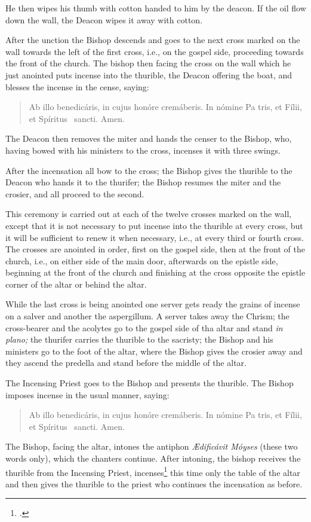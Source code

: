 \documentclass[letterpaper]{report}
\newcommand\blessincense{
\begin{quote}
   Ab illo benedicáris, in cujus honóre cremáberis. In nómine Pa\cross
    tris, et Fí\cross lii, et Spíritus \cross\ sancti. \rbar Amen.
\end{quote}
}
\begin{document}
{    He then wipes his thumb with cotton handed to him by the deacon. If the oil
    flow down the wall, the Deacon wipes it away with cotton.

    \rubric After the unction the Bishop descends and goes to the next cross
    marked on the wall towards the left of the first cross, i.e., on the
    gospel side, proceeding towards the front of the church. The bishop then
    facing the cross on the wall which he just anointed puts incense into the
    thurible, the Deacon offering the boat, and blesses the incense in the
    cense, saying: 

    \blessincense

    The Deacon then removes the miter and hands the censer to the Bishop, who,
    having bowed with his ministers to the cross, incenses it with three
    swings.

    After the incensation all bow to the cross; the Bishop gives the thurible
    to the Deacon who hands it to the thurifer; the Bishop resumes the miter
    and the crosier, and all proceed to the second. 
    
    \rubric This ceremony is carried out at each of the twelve crosses marked
    on the wall, except that it is not necessary to put incense into the
    thurible at every cross, but it will be sufficient to renew it when
    necessary, i.e., at every third or fourth cross. The crosses are anointed
    in order, first on the gospel side, then at the front of the church, i.e.,
    on either side of the main door, afterwards on the epistle side, beginning
    at the front of the church and finishing at the cross opposite the epistle
    corner of the altar or behind the altar.

    \rubric While the last cross is being anointed one server gets ready the
    grains of incense on a salver and another the aspergillum. A server takes
    away the Chrism; the cross-bearer and the acolytes go to the gospel side of
    tha altar and stand \textit{in plano;} the thurifer carries the thurible to
    the sacristy; the Bishop and his ministers go to the foot of the altar,
    where the Bishop gives the crosier away and they ascend the predella and
    stand before the middle of the altar.

    \rubric The Incensing Priest goes to the Bishop and presents the thurible.
    The Bishop imposes incense in the usual manner, saying:

    \blessincense

    The Bishop, facing the altar, intones the antiphon \textit{\AE dificávit
    Móyses} (these two words only), which the chanters continue. After
    intoning, the bishop receives the thurible from the Incensing Priest,
    incenses\footcite[ It seems that a single swing to the middle, one to the
    left, and one to the right suffices. ][]{consecranda:1956} this time only
    the table of the altar and then gives the thurible to the priest who
    continues the incensation as before.

}
\end{document}

